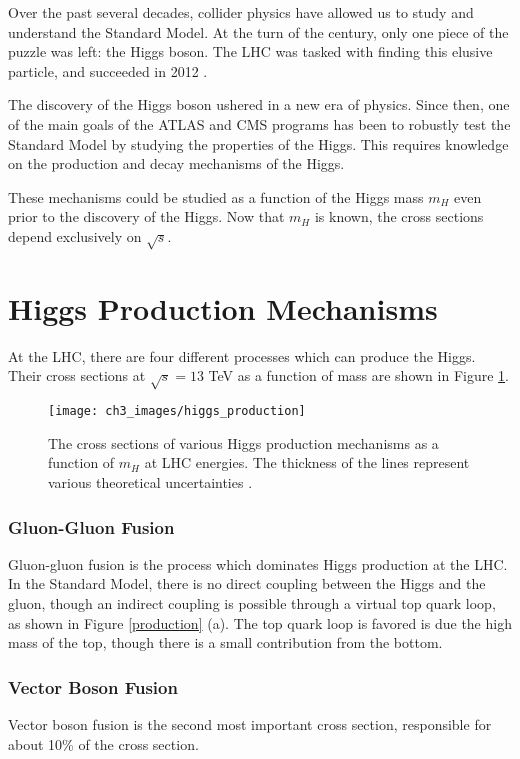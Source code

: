 \documentclass[10pt,a4paper]{book}
\begin{document}
Over the past several decades, collider physics have allowed us to study and understand the Standard Model. At the turn of the century, only one piece of the puzzle was left: the Higgs boson. The LHC was tasked with finding this elusive particle, and succeeded in 2012 \cite{ATLAS:2012yve, CMS:2012qbp}.

The discovery of the Higgs boson ushered in a new era of physics. Since then, one of the main goals of the ATLAS and CMS programs has been to robustly test the Standard Model by studying the properties of the Higgs. This requires knowledge on the production and decay mechanisms of the Higgs. 

These mechanisms could be studied as a function of the Higgs mass $m_{H}$ even prior to the discovery of the Higgs. Now that $m_{H}$ is known, the cross sections depend exclusively on $\sqrt{s}$. 

\section{Higgs Production Mechanisms}

At the LHC, there are four different processes which can produce the Higgs. Their cross sections at $\sqrt{s} = 13$ TeV as a function of mass are shown in Figure \ref{Higgs production}. 

\begin{figure}
\centering
\texttt{[image: ch3\_images/higgs\_production]}
\caption{The cross sections of various Higgs production mechanisms as a function of $m_H$ at LHC energies. The thickness of the lines represent various theoretical uncertainties \cite{LHCHiggsCrossSectionWorkingGroup:2016ypw}.}
\label{Higgs production}
\end{figure}

\subsubsection{Gluon-Gluon Fusion}
Gluon-gluon fusion is the process which dominates Higgs production at the LHC.
In the Standard Model, there is no direct coupling between the Higgs and the gluon, though an indirect coupling is possible through a virtual top quark loop, as shown in Figure \ref{production} (a). The top quark loop is favored is due the high mass of the top, though there is a small contribution from the bottom.

\subsubsection{Vector Boson Fusion}
Vector boson fusion is the second most important cross section, responsible for about 10\% of the cross section. 
\end{document}
